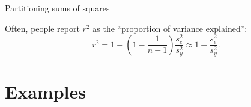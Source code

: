 \begin{frame}{Partitioning sums of squares}

    Often, people report $r^2$ as the ``\alert{proportion of variance explained}'':
    \[
        r^2 = 1 - (1-\frac{1}{n-1}) \frac{s_e^2}{s_y^2} \approx 1 - \frac{s_e^2}{s_y^2}.
    \]

    \pause




\end{frame}


\section{Examples}



